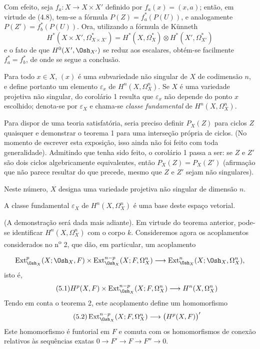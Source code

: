 Com efeito, seja $f_a:X\longrightarrow X\times X'$ definido por
$f_a(x)=(x,a)$; então, em virtude de (4.8), tem-se a fórmula
$P(Z)=f_a^{*}(P(U))$, e analogamente $P(Z')=f_b^{*}(P(U))$. Ora, utilizando a fórmula de
Künneth
\[
  H^{*}(X\times X',\Omega_{X\times X'}^{*})
  =H^{*}(X,\Omega_X^{*})\otimes H^{*}(X',\Omega_{X'}^{*})
\]
e o fato de que $H^{0}(X',\Osh_{X'})$ se reduz aos escalares, obtém-se
facilmente $f_a^{*}=f_b^{*}$, de onde se segue a conclusão.

Para todo $x\in X$, $(x)$ é uma subvariedade não singular de $X$ de
codimensão $n$, e define portanto um elemento $\varepsilon_x$ de
$H^{n}(X,\Omega_X^{n})$. Se $X$ é uma variedade projetiva não singular, do
corolário 1 resulta que $\varepsilon_x$ não depende do ponto $x$ escolhido; denota-se
por $\varepsilon_X$ e chama-se \emph{classe fundamental} de
$H^{n}(X,\Omega_X^{n})$.

 Para dispor de uma teoria satisfatória, seria preciso definir
$P_X(Z)$ para ciclos $Z$ quaisquer e demonstrar o teorema 1 para uma
interseção própria de ciclos. (No momento de escrever esta exposição, isso ainda não foi
feito com toda generalidade). Admitindo que tenha sido feito, o corolário 1
passa a ser: se $Z$ e $Z'$ são dois ciclos algebricamente equivalentes, então
$P_X(Z)=P_X(Z')$ (afirmação que não parece resultar do que precede, mesmo que
$Z$ e $Z'$ sejam não singulares).


Neste número, $X$ designa uma variedade projetiva não singular de dimensão
$n$.

 A classe fundamental $\varepsilon_X$ de
$H^{n}(X,\Omega_X^{n})$ é uma base deste espaço vetorial.

(A demonstração será dada mais adiante). Em virtude do teorema anterior, pode-se
identificar $H^{n}(X,\Omega_X^{n})$ com o corpo $k$. Consideremos agora os
acoplamentos considerados no n\textsuperscript{o} 2, que dão, em particular, um
acoplamento

\[
\operatorname{Ext}_{\Osh_X}^{p}(X;\Osh_X,F)
\times\operatorname{Ext}_{\Osh_X}^{n-p}(X;F,\Omega_X^{n})
\longrightarrow
\operatorname{Ext}_{\Osh_X}^{n}(X;\Osh_X,\Omega_X^{n}),
\]
isto é,
\begin{equation}\tag{5.1}
  H^{p}(X,F)
  \times\operatorname{Ext}_{\Osh_X}^{n-p}(X;F,\Omega_X^{n})
  \longrightarrow H^{n}(X,\Omega_X^{n})
\end{equation}
Tendo em conta o teorema 2, este acoplamento define um homomorfismo
\begin{equation}\tag{5.2}
  \operatorname{Ext}_{\Osh_X}^{n-p}(X;F,\Omega_X^{n})
  \longrightarrow\bigl(H^{p}(X,F)\bigr)'
\end{equation}
Este homomorfismo é funtorial em $F$ e comuta com os homomorfismos de conexão
relativos às sequências exatas $0\longrightarrow F'\longrightarrow F
\longrightarrow F''\longrightarrow0$.

